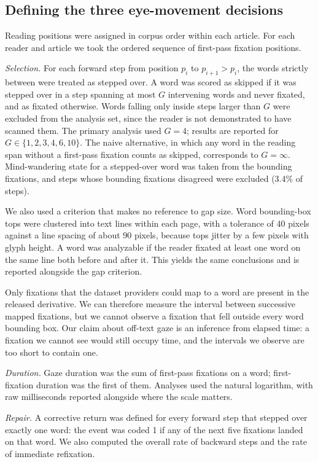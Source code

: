\documentclass[11pt]{article}
\begin{document}
\subsection{Defining the three eye-movement decisions}

Reading positions were assigned in corpus order within each article. For each reader and
article we took the ordered sequence of first-pass fixation positions.

\emph{Selection.} For each forward step from position $p_i$ to $p_{i+1}>p_i$, the words
strictly between were treated as stepped over. A word was scored as skipped if it was stepped
over in a step spanning at most $G$ intervening words and never fixated, and as fixated
otherwise. Words falling only inside steps larger than $G$ were excluded from the analysis set,
since the reader is not demonstrated to have scanned them. The primary analysis used $G=4$;
results are reported for $G\in\{1,2,3,4,6,10\}$. The naive alternative, in which any word in
the reading span without a first-pass fixation counts as skipped, corresponds to
$G=\infty$. Mind-wandering state for a stepped-over word was taken from the bounding
fixations, and steps whose bounding fixations disagreed were excluded (3.4\% of steps).

We also used a criterion that makes no reference to gap size. Word bounding-box tops were
clustered into text lines within each page, with a tolerance of 40 pixels against a line
spacing of about 90 pixels, because tops jitter by a few pixels with glyph height. A word was
analyzable if the reader fixated at least one word on the same line both before and after it.
This yields the same conclusions and is reported alongside the gap criterion.

Only fixations that the dataset providers could map to a word are present in the released
derivative. We can therefore measure the interval between successive mapped fixations, but we
cannot observe a fixation that fell outside every word bounding box. Our claim about off-text
gaze is an inference from elapsed time: a fixation we cannot see would still occupy time, and
the intervals we observe are too short to contain one.

\emph{Duration.} Gaze duration was the sum of first-pass fixations on a word; first-fixation
duration was the first of them. Analyses used the natural logarithm, with raw milliseconds
reported alongside where the scale matters.

\emph{Repair.} A corrective return was defined for every forward step that stepped over exactly
one word: the event was coded 1 if any of the next five fixations landed on that word. We also
computed the overall rate of backward steps and the rate of immediate refixation.
\end{document}
